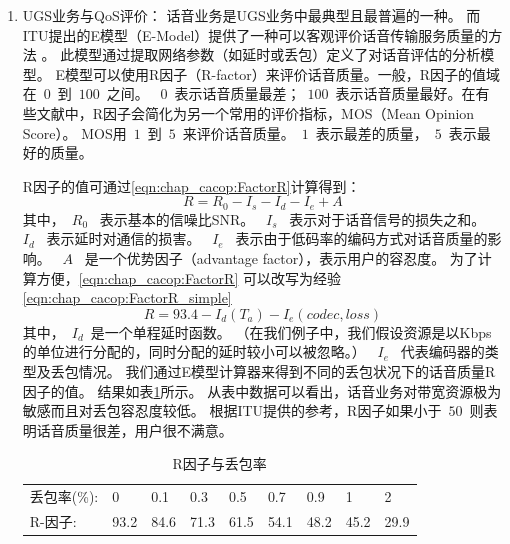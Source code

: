 \begin{enumerate}[(1)]
    \item UGS业务与QoS评价：
        话音业务是UGS业务中最典型且最普遍的一种。
        而ITU提出的E模型（E-Model）提供了一种可以客观评价话音传输服务质量的方法 \cite{ITU:G107}。
        此模型通过提取网络参数（如延时或丢包）定义了对话音评估的分析模型。
        E模型可以使用R因子（R-factor）来评价话音质量。一般，R因子的值域在~$0$~到~$100$~之间。
        ~$0$~表示话音质量最差；~$100$~表示话音质量最好。在有些文献中，R因子会简化为另一个常用的评价指标，MOS（Mean Opinion Score）。
        MOS用~$1$~到~$5$~来评价话音质量。~$1$~表示最差的质量，~$5$~表示最好的质量\cite{NK:IEICE:2005}。

        R因子的值可通过\eqref{eqn:chap_cacop:FactorR}计算得到：
\begin{equation}
\label{eqn:chap_cacop:FactorR}
R = R_0 − I_s − I_d − I_e + A 
\end{equation}
其中，~$R_0$~ 表示基本的信噪比SNR。
~$I_s$~ 表示对于话音信号的损失之和。
~$I_d$~ 表示延时对通信的损害。
~$I_e$~ 表示由于低码率的编码方式对话音质量的影响。
~$A$~ 是一个优势因子（advantage factor），表示用户的容忍度。
为了计算方便，\eqref{eqn:chap_cacop:FactorR} 可以改写为经验\eqref{eqn:chap_cacop:FactorR_simple}
\begin{equation}
R = 93. 4 - I_d ( T_a ) -I_e ( codec, loss )
\label{eqn:chap_cacop:FactorR_simple}
\end{equation}
其中，~$I_d$~是一个单程延时函数。
（在我们例子中，我们假设资源是以Kbps的单位进行分配的，同时分配的延时较小可以被忽略。）
~$I_e$~ 代表编码器的类型及丢包情况。
我们通过E模型计算器来得到不同的丢包状况下的话音质量R因子的值\cite{ITU:EModel:Caculator}。 
结果如表\ref{tb:R_factor}所示。
从表中数据可以看出，话音业务对带宽资源极为敏感而且对丢包容忍度较低。
根据ITU提供的参考，R因子如果小于~$50$~则表明话音质量很差，用户很不满意。

\begin{table}[tb]
\caption{R因子与丢包率} \label{tb:R_factor}
\begin{center}
\wuhao
\begin{tabularx}{0.99\textwidth}{lXXXXXXXX}
\toprule 
丢包率(\%): & 0& 0.1& 0.3& 0.5& 0.7& 0.9& 1& 2\\
R-因子: &93.2& 84.6& 71.3& 61.5& 54.1& 48.2& 45.2& 29.9\\ 
\bottomrule
\end{tabularx}
\end{center}
\end{table}


\end{enumerate}
